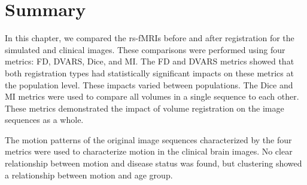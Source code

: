 \section{Summary}

In this chapter, we compared the rs-fMRIs before and after registration for the simulated and clinical images. These comparisons were performed using four metrics: FD, DVARS, Dice, and MI. The FD and DVARS metrics showed that both registration types had statistically significant impacts on these metrics at the population level. These impacts varied between populations. The Dice and MI metrics were used to compare all volumes in a single sequence to each other. These metrics demonstrated the impact of volume registration on the image sequences as a whole. 

The motion patterns of the original image sequences characterized by the four metrics were used to characterize motion in the clinical brain images. No clear relationship between motion and disease status was found, but clustering showed a relationship between motion and age group.






